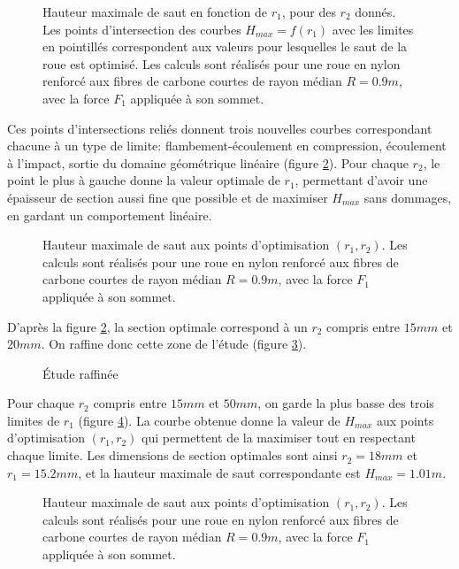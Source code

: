 \begin{figure}[h]
\centering
\def\svgwidth{500}

\caption{Hauteur maximale de saut en fonction de $r_1$, pour des $r_2$ donnés. Les points d'intersection des courbes $H_{max}=f(r_1)$ avec les limites en pointillés correspondent aux valeurs pour lesquelles le saut de la roue est optimisé. Les calculs sont réalisés pour une roue en nylon renforcé aux fibres de carbone courtes de rayon médian $R=0.9 m$, avec la force $F_1$ appliquée à son sommet.}
\label{fig:fle3}
\end{figure}

Ces points d'intersections reliés donnent trois nouvelles courbes correspondant chacune à un type de limite: flambement-écoulement en compression, écoulement à l'impact, sortie du domaine géométrique linéaire (figure \ref{fig:fle51}). Pour chaque $r_2$, le point le plus à gauche donne la valeur optimale de $r_1$, permettant d'avoir une épaisseur de section aussi fine que possible et de maximiser $H_{max}$ sans dommages, en gardant un comportement linéaire.

\begin{figure}[h]
\centering
\def\svgwidth{450}

\caption{Hauteur maximale de saut aux points d'optimisation $(r_1,r_2)$. Les calculs sont réalisés pour une roue en nylon renforcé aux fibres de carbone courtes de rayon médian $R=0.9 m$, avec la force $F_1$ appliquée à son sommet.}
\label{fig:fle51}
\end{figure}

D'après la figure \ref{fig:fle51}, la section optimale correspond à un $r_2$ compris entre $15mm$ et $20mm$. On raffine donc cette zone de l'étude (figure \ref{fig:fle52}).

\begin{figure}[h]
\centering
\def\svgwidth{400}

\caption{Étude raffinée}
\label{fig:fle52}
\end{figure}
Pour chaque $r_2$ compris entre $15mm$ et $50mm$, on garde la plus basse des trois limites de $r_1$ (figure \ref{fig:fle5}). La courbe obtenue donne la valeur de $H_{max}$ aux points d'optimisation $(r_1,r_2)$ qui permettent de la maximiser tout en respectant chaque limite. 
Les dimensions de section optimales sont ainsi $r_2=18 mm$ et $r_1=15.2 mm$, et la hauteur maximale de saut correspondante est $H_{max}=1.01 m$.
\begin{figure}[h]
\centering
\def\svgwidth{300}

\caption{Hauteur maximale de saut aux points d'optimisation $(r_1,r_2)$. Les calculs sont réalisés pour une roue en nylon renforcé aux fibres de carbone courtes de rayon médian $R=0.9 m$, avec la force $F_1$ appliquée à son sommet.}
\label{fig:fle5}
\end{figure}


